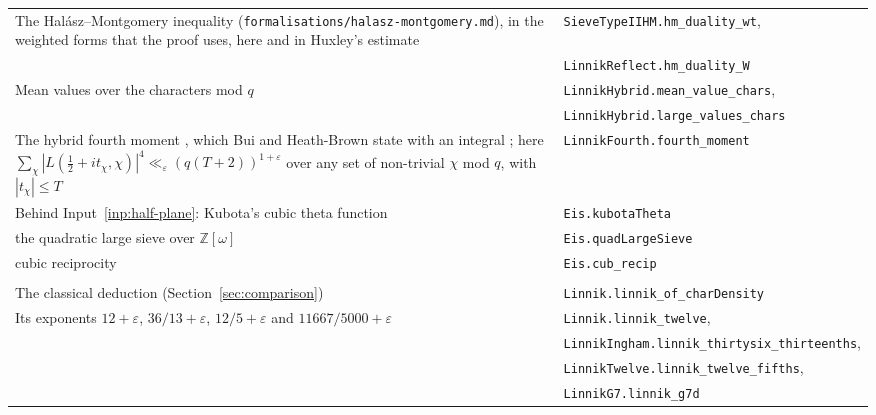 \documentclass[11pt]{article}
\theoremstyle{definition}
\newcommand{\lean}[1]{\texttt{#1}}
\newcommand{\file}[1]{\nolinkurl{#1}}
\begin{document}
{\begin{longtable}{@{}>{\raggedright\arraybackslash}p{}l@{}}
The Hal\'asz--Montgomery inequality (\file{formalisations/halasz-montgomery.md}), in the weighted forms that the proof
uses, here and in Huxley's estimate & \lean{SieveTypeIIHM.hm\_duality\_wt}, \\
 & \lean{LinnikReflect.hm\_duality\_W} \\
Mean values over the characters mod $q$ \cite{montgomery-vaughan, gallagher67, gallagher70} &
\lean{LinnikHybrid.mean\_value\_chars}, \\
 & \lean{LinnikHybrid.large\_values\_chars} \\
The hybrid fourth moment \cite{montgomery-topics}, which Bui and Heath-Brown state with an integral \cite{bui-hb};
here $\sum_\chi |L(\frac12 + it_\chi, \chi)|^4 \ll_\varepsilon (q(T + 2))^{1 + \varepsilon}$ over any set of non-trivial
$\chi$ mod $q$, with $|t_\chi| \le T$ &
\lean{LinnikFourth.fourth\_moment} \\
Behind Input~\ref{inp:half-plane}: Kubota's cubic theta function \cite{kubota, patterson, dunn-radziwill} &
  \lean{Eis.kubotaTheta} \\
\quad the quadratic large sieve over $\mathbb Z[\omega]$ \cite{hb-quadratic, goldmakher-louvel} &
\lean{Eis.quadLargeSieve} \\
\quad cubic reciprocity \cite{ireland-rosen} & \lean{Eis.cub\_recip} \\
\midrule
\multicolumn{2}{@{}l}{\emph{The classical deduction}} \\
The classical deduction (Section~\ref{sec:comparison}) & \lean{Linnik.linnik\_of\_charDensity} \\
Its exponents $12 + \varepsilon$, $36/13 + \varepsilon$, $12/5 + \varepsilon$ and $11667/5000 + \varepsilon$ &
\lean{Linnik.linnik\_twelve}, \\
 & \lean{LinnikIngham.linnik\_thirtysix\_thirteenths}, \\
 & \lean{LinnikTwelve.linnik\_twelve\_fifths}, \\
 & \lean{LinnikG7.linnik\_g7d} \\
\bottomrule
\end{longtable}
}
\end{document}
